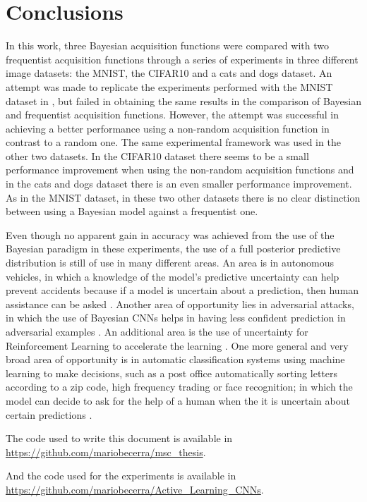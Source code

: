 
\chapter{Conclusions}
\label{ch:conclusions}


In this work, three Bayesian acquisition functions were compared with two frequentist acquisition functions through a series of experiments in three different image datasets: the MNIST, the CIFAR10 and a cats and dogs dataset. An attempt was made to replicate the experiments performed with the MNIST dataset in \cite{Gal2016Active}, but failed in obtaining the same results in the comparison of Bayesian and frequentist acquisition functions. However, the attempt was successful in achieving a better performance using a non-random acquisition function in contrast to a random one. The same experimental framework was used in the other two datasets. In the CIFAR10 dataset there seems to be a small performance improvement when using the non-random acquisition functions and in the cats and dogs dataset there is an even smaller performance improvement. As in the MNIST dataset, in these two other datasets there is no clear distinction between using a Bayesian model against a frequentist one.

Even though no apparent gain in accuracy was achieved from the use of the Bayesian paradigm in these experiments, the use of a full posterior predictive distribution is still of use in many different areas. An area is in autonomous vehicles, in which a knowledge of the model's predictive uncertainty can help prevent accidents because if a model is uncertain about a prediction, then human assistance can be asked \cite{gal2016uncertainty} \cite{kendall2017uncertainties} \cite{michelmore2018evaluating}. Another area of opportunity lies in adversarial attacks, in which the use of Bayesian CNNs helps in having less confident prediction in adversarial examples \cite{li2017dropout} \cite{rawat2017adversarial} \cite{smith2018understanding}. An additional area is the use of uncertainty for Reinforcement Learning to accelerate the learning \cite{gal2016uncertainty}. One more general and very broad area of opportunity is in automatic classification systems using machine learning to make decisions, such as a post office automatically sorting letters according to a zip code, high frequency trading or face recognition; in which the model can decide to ask for the help of a human when the it is uncertain about certain predictions \cite{gal2016uncertainty}.

The code used to write this document is available in \url{https://github.com/mariobecerra/msc_thesis}.

And the code used for the experiments is available in \url{https://github.com/mariobecerra/Active_Learning_CNNs}.
